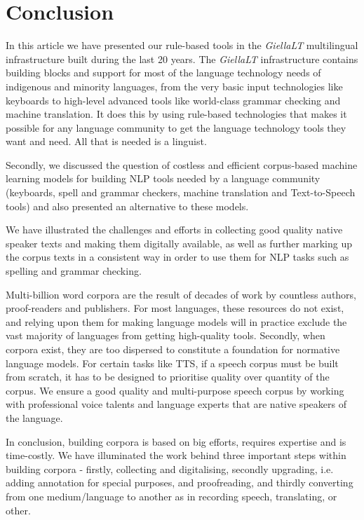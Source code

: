 \documentclass[free]{flammie}
\begin{document}
\section{Conclusion}









In this article we have presented our rule-based tools in the \textit{GiellaLT}
multilingual infrastructure built during the last 20 years. The
\textit{GiellaLT} infrastructure contains building blocks and support for most
of the language technology needs of indigenous and minority languages, from the
very basic input technologies like keyboards to high-level advanced tools like
world-class grammar checking and machine translation. It does this by using
rule-based technologies that makes it possible for any language community to get
the language technology tools they want and need.  All that is needed is a
linguist.

Secondly, we discussed the question of costless and efficient corpus-based
machine learning models for building NLP tools needed by a language community
(keyboards, spell and grammar checkers, machine translation and Text-to-Speech
tools) and also presented an alternative to these models.


We have illustrated the challenges and efforts in collecting good quality native
speaker texts and making them digitally available, as well as further marking up
the corpus texts in a consistent way in order to use them for NLP tasks such as
spelling and grammar checking.



Multi-billion word corpora are the result of decades of work by countless
authors, proof-readers and publishers. For most languages, these resources do
not exist, and relying upon them for making language models will in practice
exclude the vast majority of languages from getting high-quality tools.
Secondly, when corpora exist, they are too dispersed to constitute a foundation
for normative language models.  For certain tasks like TTS, if a speech corpus
must be built from scratch, it has to be designed to prioritise quality over
quantity of the corpus. We ensure a good quality and multi-purpose speech corpus
by working with professional voice talents and language experts that are native
speakers of the language.


In conclusion, building corpora is based on big efforts, requires expertise and
is time-costly. We have illuminated the work behind three important steps within
building corpora - firstly, collecting and digitalising, secondly upgrading,
i.e. adding annotation for special purposes, and proofreading, and thirdly
converting from one medium/language to another as in  recording speech,
translating, or other.
\end{document}
